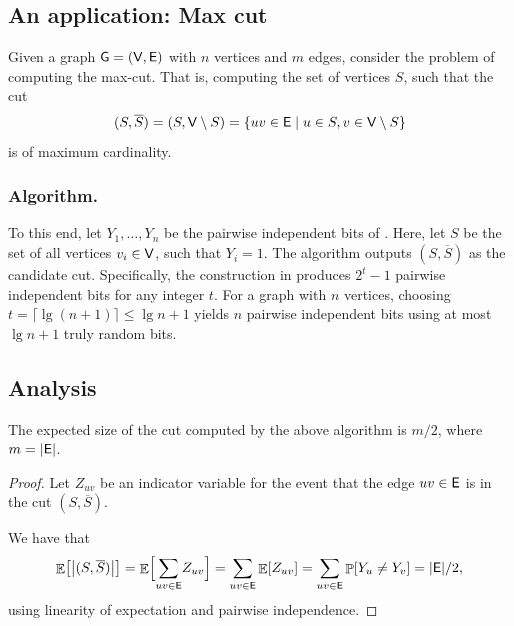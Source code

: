 \subsection{An application: Max cut}

Given a graph $\mathsf{G} = (\mathsf{V}, \mathsf{E})$ with $n$ vertices and $m$
edges, consider the problem of computing the max-cut. That is,
computing the set of vertices $S$, such that the cut
\begin{equation*}
    (S, \overline{S})%
    =%
    (S, \Vertices\setminus S) =%
    \Set{uv \in \Edges}{ u \in S, v \in \Vertices \setminus S}
\end{equation*}
is of maximum cardinality.

\subsubsection{Algorithm.}
To this end, let $Y_1, \ldots, Y_n$ be the pairwise independent bits of
. Here, let $S$ be the set of all vertices
$v_i \in \mathsf{V}$, such that $Y_i= 1$. The algorithm outputs
$(S, \overline{S})$ as the candidate cut.  Specifically, the construction
in  produces $2^t - 1$ pairwise independent bits for any
integer $t$. For a graph with $n$ vertices, choosing
$t = \lceil \lg(n+1) \rceil \leq \lg n + 1$ yields $n$ pairwise independent bits using
at most $\lg n + 1$ truly random bits.

\subsection{Analysis}

\begin{lemma}
    The expected size of the cut computed by the above algorithm is
    $m/2$, where $m = |\mathsf{E}|$.
\end{lemma}
\begin{proof}
    Let $Z_{uv}$ be an indicator variable for the event that the edge
    $uv \in \mathsf{E}$ is in the cut $(S,\overline{S})$.

    We have that
    \begin{equation*}
        \Ex{ \bigl|  ( S, \overline{S} ) \bigr| } %
        =%
        \Ex{\Bigl. \smash{\sum_{uv \in\Edges}} Z_{uv}}%
        =%
        \sum_{uv \in\Edges} \Ex{Z_{uv}}%
        =%
        \sum_{uv \in\Edges} \Prob{Y_u \neq Y_v}%
        =%
        |\Edges|/2,
    \end{equation*}
    using linearity of expectation and pairwise independence.
\end{proof}


